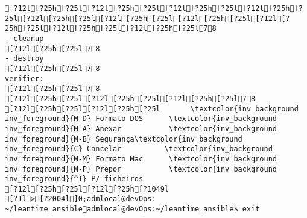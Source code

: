 \documentclass{scrartcl}
\begin{document}
\begin{Verbatim}
[?12l[?25h[?25l[?12l[?25h[?25l[?12l[?25h[?25l[?12l[?25h[?25l[?12l[?25h[?25l[?12l[?25h[?25l[?12l[?25h[?25l[?12l[?25h[?25l[?12l[?25h[?25l[?12l[?25h[?25l78
- cleanup
[?12l[?25h[?25l78
- destroy
[?12l[?25h[?25l78
verifier:
[?12l[?25h[?25l78
[?12l[?25h[?25l[?12l[?25h[?25l[?12l[?25h[?25l78
[?12l[?25h[?25l[?12l[?25h[?25l       \textcolor{inv_background inv_foreground}{M-D} Formato DOS      \textcolor{inv_background inv_foreground}{M-A} Anexar           \textcolor{inv_background inv_foreground}{M-B} Segurança\textcolor{inv_background inv_foreground}{C} Cancelar          \textcolor{inv_background inv_foreground}{M-M} Formato Mac      \textcolor{inv_background inv_foreground}{M-P} Prepor           \textcolor{inv_background inv_foreground}{^T} P/ ficheiros
[?12l[?25h[?25l[?12l[?25h[?1049l
[?1l>[?2004l]0;admlocal@devOps: ~/leantime_ansibleadmlocal@devOps:~/leantime_ansible$ exit

\end{Verbatim}
\end{document}

